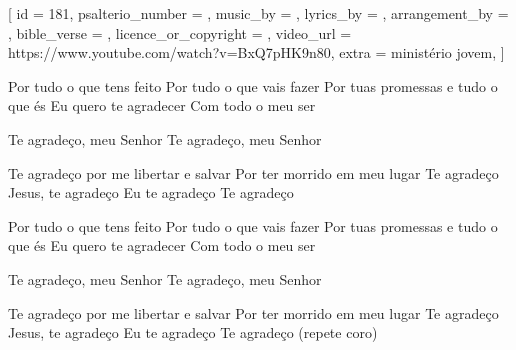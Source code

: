 [
    id                     = {181},
    psalterio_number       = {},
    music_by               = {},
    lyrics_by              = {},
    arrangement_by         = {},
    bible_verse            = {},
    licence_or_copyright   = {},
    video_url              = {https://www.youtube.com/watch?v=BxQ7pHK9n80},
    extra                  = {ministério jovem},
]

\beginverse
Por tudo o que tens feito
Por tudo o que vais fazer
Por tuas promessas e tudo o que és
Eu quero te agradecer
Com todo o meu ser
\endverse

\beginchorus
Te agradeço, meu Senhor
Te agradeço, meu Senhor

Te agradeço por me libertar e salvar
Por ter morrido em meu lugar
Te agradeço
Jesus, te agradeço
Eu te agradeço
Te agradeço
\endchorus

\beginverse
Por tudo o que tens feito
Por tudo o que vais fazer
Por tuas promessas e tudo o que és
Eu quero te agradecer
Com todo o meu ser
\endverse

\beginchorus
Te agradeço, meu Senhor
Te agradeço, meu Senhor

Te agradeço por me libertar e salvar
Por ter morrido em meu lugar
Te agradeço
Jesus, te agradeço
Eu te agradeço
Te agradeço (repete coro)
\endchorus

\endsong
